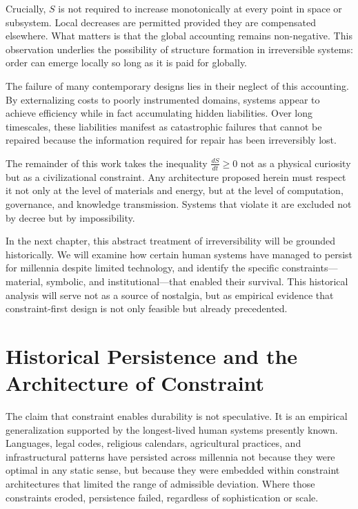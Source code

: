 \documentclass[12pt,oneside]{book}
\begin{document}
Crucially, \(S\) is not required to increase monotonically at every point in space or subsystem. Local decreases are permitted provided they are compensated elsewhere. What matters is that the global accounting remains non-negative. This observation underlies the possibility of structure formation in irreversible systems: order can emerge locally so long as it is paid for globally.

The failure of many contemporary designs lies in their neglect of this accounting. By externalizing costs to poorly instrumented domains, systems appear to achieve efficiency while in fact accumulating hidden liabilities. Over long timescales, these liabilities manifest as catastrophic failures that cannot be repaired because the information required for repair has been irreversibly lost.

The remainder of this work takes the inequality \(\frac{dS}{dt} \geq 0\) not as a physical curiosity but as a civilizational constraint. Any architecture proposed herein must respect it not only at the level of materials and energy, but at the level of computation, governance, and knowledge transmission. Systems that violate it are excluded not by decree but by impossibility.

In the next chapter, this abstract treatment of irreversibility will be grounded historically. We will examine how certain human systems have managed to persist for millennia despite limited technology, and identify the specific constraints—material, symbolic, and institutional—that enabled their survival. This historical analysis will serve not as a source of nostalgia, but as empirical evidence that constraint-first design is not only feasible but already precedented.

\chapter{Historical Persistence and the Architecture of Constraint}

The claim that constraint enables durability is not speculative. It is an empirical generalization supported by the longest-lived human systems presently known. Languages, legal codes, religious calendars, agricultural practices, and infrastructural patterns have persisted across millennia not because they were optimal in any static sense, but because they were embedded within constraint architectures that limited the range of admissible deviation. Where those constraints eroded, persistence failed, regardless of sophistication or scale.
\end{document}
